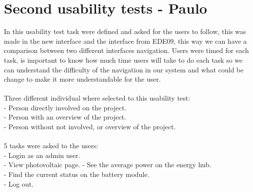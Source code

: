 \section{Second usability tests - Paulo}

In this usability test task were defined and asked for the users to follow, this was made in the new interface and the interface from EDE09, this way we can have a comparison between two different interfaces navigation. Users were timed for each task, is important to know how much time users will take to do each task so we can understand the difficulty of the navigation in our system and what could be change to make it more understandable for the user.
\\
\\Three different individual where selected to this usability test:\\
- Person directly involved on the project.\\
- Person with an overview of the project.\\
- Person without not involved, or overview of the project.\\
\\
5 tasks were asked to the users:\\
- Login as an admin user.\\
- View photovoltaic page.
- See the average power on the energy hub.\\
- Find the current status on the battery module.\\
- Log out.
\\















